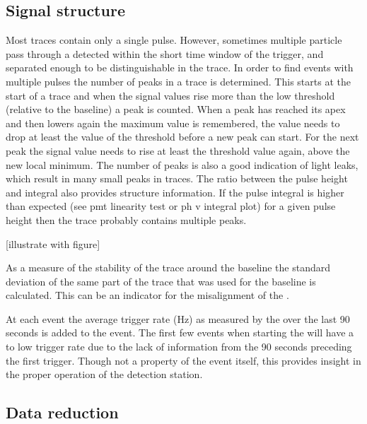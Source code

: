 \subsection{Signal structure}

Most traces contain only a single pulse. However, sometimes multiple particle pass through a detected within the short time window of the trigger, and separated enough to be distinguishable in the trace. In order to find events with multiple pulses the number of peaks in a trace is determined. This starts at the start of a trace and when the signal values rise more than the low threshold (relative to the baseline) a peak is counted. When a peak has reached its apex and then lowers again the maximum value is remembered, the value needs to drop at least the value of the threshold before a new peak can start. For the next peak the signal value needs to rise at least the threshold value again, above the new local minimum. The number of peaks is also a good indication of light leaks, which result in many small peaks in traces. The ratio between the pulse height and integral also provides structure information. If the pulse integral is higher than expected (see pmt linearity test or ph v integral plot) for a given pulse height then the trace probably contains multiple peaks.

[illustrate with figure]

As a measure of the stability of the trace around the baseline the standard deviation of the same part of the trace that was used for the baseline is calculated. This can be an indicator for the misalignment of the \adcs.

At each event the average trigger rate (\si{\hertz}) as measured by the \daq over the last 90 seconds is added to the event. The first few events when starting the \daq will have a to low trigger rate due to the lack of information from the 90 seconds preceding the first trigger. Though not a property of the event itself, this provides insight in the proper operation of the detection station.


\subsection{Data reduction}

